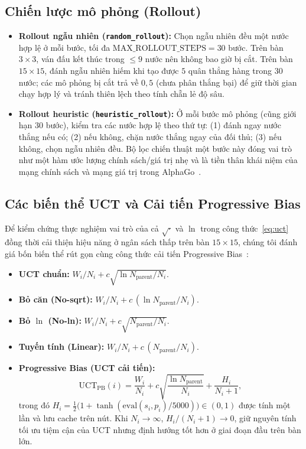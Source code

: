 \documentclass[conference]{IEEEtran}
\begin{document}
\subsection{Chiến lược mô phỏng (Rollout)}
\begin{itemize}
    \item \textbf{Rollout ngẫu nhiên (\texttt{random\_rollout}):} Chọn ngẫu nhiên đều một nước hợp lệ ở mỗi bước, tối đa $\text{MAX\_ROLLOUT\_STEPS} = 30$ bước. Trên bàn $3\times 3$, ván đấu kết thúc trong $\le 9$ nước nên không bao giờ bị cắt. Trên bàn $15\times 15$, đánh ngẫu nhiên hiếm khi tạo được $5$ quân thẳng hàng trong $30$ nước; các mô phỏng bị cắt trả về $0{,}5$ (chưa phân thắng bại) để giữ thời gian chạy hợp lý và tránh thiên lệch theo tính chẵn lẻ độ sâu.
    \item \textbf{Rollout heuristic (\texttt{heuristic\_rollout}):} Ở mỗi bước mô phỏng (cũng giới hạn $30$ bước), kiểm tra các nước hợp lệ theo thứ tự: (1) đánh ngay nước thắng nếu có; (2) nếu không, chặn nước thắng ngay của đối thủ; (3) nếu không, chọn ngẫu nhiên đều. Bộ lọc chiến thuật một bước này đóng vai trò như một hàm ước lượng chính sách/giá trị nhẹ và là tiền thân khái niệm của mạng chính sách và mạng giá trị trong AlphaGo~\cite{silver2016}.
\end{itemize}

\subsection{Các biến thể UCT và Cải tiến Progressive Bias}
Để kiểm chứng thực nghiệm vai trò của cả $\sqrt{\cdot}$ và $\ln$ trong công thức~\eqref{eq:uct} đồng thời cải thiện hiệu năng ở ngân sách thấp trên bàn $15\times 15$, chúng tôi đánh giá bốn biến thể rút gọn cùng công thức cải tiến Progressive Bias~\cite{chaslot2008}:
\begin{itemize}
    \item \textbf{UCT chuẩn:} $W_i/N_i + c\sqrt{\ln N_{\mathrm{parent}} / N_i}$.
    \item \textbf{Bỏ căn (No-sqrt):} $W_i/N_i + c\,(\ln N_{\mathrm{parent}} / N_i)$.
    \item \textbf{Bỏ $\ln$ (No-ln):} $W_i/N_i + c\sqrt{N_{\mathrm{parent}} / N_i}$.
    \item \textbf{Tuyến tính (Linear):} $W_i/N_i + c\,(N_{\mathrm{parent}} / N_i)$.
    \item \textbf{Progressive Bias (UCT cải tiến):}
    \begin{equation}
    \text{UCT}_{\mathrm{PB}}(i) = \frac{W_i}{N_i} + c\sqrt{\frac{\ln N_{\mathrm{parent}}}{N_i}} + \frac{H_i}{N_i + 1},
    \end{equation}
    trong đó $H_i = \frac{1}{2}\bigl(1 + \tanh(\text{eval}(s_i, p_i)/5000)\bigr) \in (0, 1)$ được tính một lần và lưu cache trên nút. Khi $N_i \to \infty$, $H_i/(N_i+1) \to 0$, giữ nguyên tính tối ưu tiệm cận của UCT nhưng định hướng tốt hơn ở giai đoạn đầu trên bàn lớn.
\end{itemize}
\end{document}
